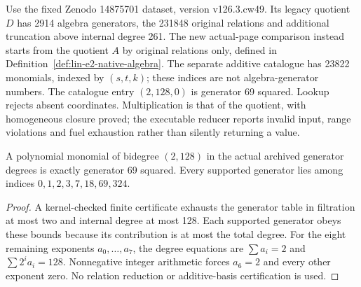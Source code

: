 \begin{definition}
  \label{def:lin-e2-catalogue}
  \leanok
  Use the fixed Zenodo 14875701 dataset, version v126.3.cw49.
  Its legacy quotient $D$ has 2914 algebra generators, the 231848
  original relations and additional truncation above internal degree 261.
  The new actual-page comparison instead starts from the quotient $A$
  by original relations only, defined in
  Definition~\ref{def:lin-e2-native-algebra}.
  The separate additive catalogue has 23822 monomials, indexed by $(s,t,k)$;
  these indices are not algebra-generator numbers. The catalogue entry
  $(2,128,0)$ is generator 69 squared. Lookup rejects absent coordinates.
  Multiplication is that of the quotient, with homogeneous closure proved;
  the executable reducer reports invalid input, range violations and fuel
  exhaustion rather than silently returning a value.
\end{definition}

\begin{proposition}
  \label{prop:lin-square-degree-unique}
  \leanok
  A polynomial monomial of bidegree $(2,128)$ in the actual archived
  generator degrees is exactly generator 69 squared. Every supported
  generator lies among indices $0,1,2,3,7,18,69,324$.
\end{proposition}
\begin{proof}
  A kernel-checked finite certificate exhausts the generator table in
  filtration at most two and internal degree at most 128. Each supported
  generator obeys these bounds because its contribution is at most the
  total degree. For the eight remaining exponents $a_0,\ldots,a_7$, the
  degree equations are $\sum a_i=2$ and
  $\sum 2^i a_i=128$. Nonnegative integer arithmetic forces $a_6=2$
  and every other exponent zero. No relation reduction or additive-basis
  certification is used.
  \leanok
\end{proof}

